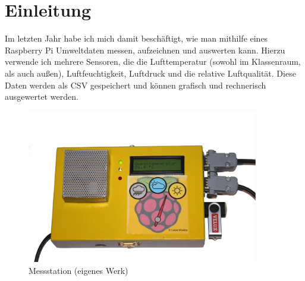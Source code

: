 \chapter{Einleitung}

Im letzten Jahr habe ich mich damit beschäftigt, wie man mithilfe eines Raspberry Pi Umweltdaten messen, aufzeichnen und auswerten kann. Hierzu verwende ich mehrere Sensoren, die die Lufttemperatur (sowohl im Klassenraum, als auch außen), Luftfeuchtigkeit, Luftdruck und die relative Luftqualität. Diese Daten werden als \gls{CSV} gespeichert und können grafisch und rechnerisch ausgewertet werden.
\begin{figure}[h]
  \centering
     \includegraphics[width=0.9\textwidth]{figures/gesamt.png}
  \caption{Messstation (eigenes Werk)}
  \label{fig:gesamt}
\end{figure}